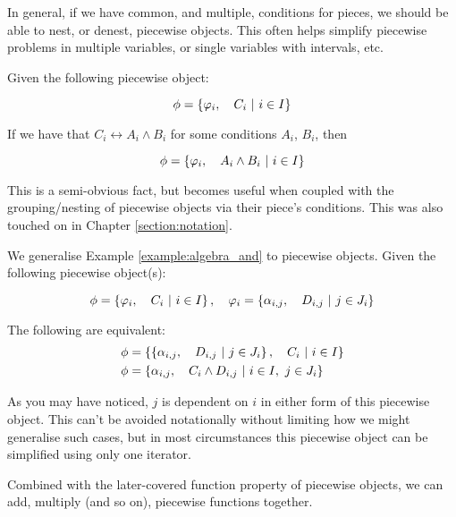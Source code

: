 In general, if we have common, and multiple, conditions for pieces, we should be able to nest, or denest, piecewise objects. This often helps simplify piecewise problems in multiple variables, or single variables with intervals, etc.

\begin{theorem}
    Given the following piecewise object:

    $$
        \phi=\left\{\varphi_i,\quad C_i\ \middle|\ i\in I\right\}
    $$

    If we have that $C_i\leftrightarrow A_i\land B_i$ for some conditions $A_i$, $B_i$, then

    $$
        \phi=\left\{\varphi_i,\quad A_i\land B_i\ \middle|\ i\in I\right\}
    $$

    This is a semi-obvious fact, but becomes useful when coupled with the grouping/nesting of piecewise objects via their piece's conditions. This was also touched on in Chapter \ref{section:notation}.
\end{theorem}

\begin{theorem}
    \label{theorem:algebra_and_values}
    We generalise Example \ref{example:algebra_and} to piecewise objects. Given the following piecewise object(s):

    $$
        \phi=\left\{\varphi_i,\quad C_i\ \middle|\ i\in I\right\},\quad \varphi_i=\left\{\alpha_{i,j},\quad D_{i,j}\ \middle|\ j\in J_i\right\}
    $$

    The following are equivalent:
    \begin{align*}
        \phi &= \left\{\left\{\alpha_{i,j},\quad D_{i,j}\ \middle|\ j\in J_i\right\},\quad C_i\ \middle|\ i\in I\right\} \\
        \phi &= \left\{\alpha_{i,j},\quad C_i\land D_{i,j}\ \middle|\ i\in I,\ j\in J_i\right\}
    \end{align*}

    As you may have noticed, $j$ is dependent on $i$ in either form of this piecewise object. This can't be avoided notationally without limiting how we might generalise such cases, but in most circumstances this piecewise object can be simplified using only one iterator.

    Combined with the later-covered function property of piecewise objects, we can add, multiply (and so on), piecewise functions together.
\end{theorem}

